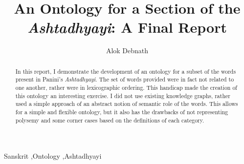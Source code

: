 \documentclass[final, 12pt]{elsarticle}
\begin{document}
\begin{frontmatter}


\title{An Ontology for a Section of the \textit{Ashtadhyayi}: A Final Report}




\author{Alok Debnath}

\address{20161122 \\
  {\tt alok.debnath@research.iiit.ac.in}}

\begin{abstract}
 In this report, I demonstrate the development of an ontology for a subset of the words present in Panini's \emph{Ashtadhyayi}. The set of words provided were in fact not related to one another, rather were in lexicographic ordering. This handicap made the creation of this ontology an interesting exercise. I did not use existing knowledge graphs, rather used a simple approach of an abstract notion of semantic role of the words. This allows for a simple and flexible ontology, but it also has the drawbacks of not representing polysemy and some corner cases based on the definitions of each category.
\end{abstract}

\begin{keyword}
Sanskrit \sep Ontology \sep Ashtadhyayi


\end{keyword}

\end{frontmatter}
\end{document}
